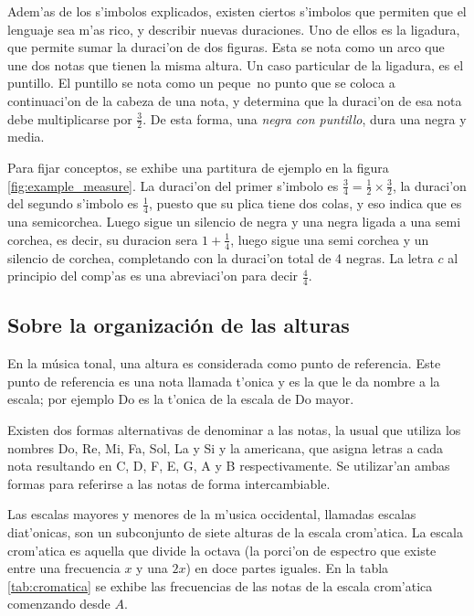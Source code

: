 Adem'as de los s'imbolos explicados, existen ciertos s'imbolos que permiten que el lenguaje sea m'as rico, y describir nuevas duraciones. Uno de ellos
es la ligadura, que permite sumar la duraci'on de dos figuras. Esta se nota como un arco que une dos notas que tienen la misma altura. 
Un caso particular de la ligadura, es el puntillo. El puntillo se nota como un peque~no punto que se coloca a 
continuaci'on de la cabeza de una nota, y determina que la duraci'on de esa nota debe multiplicarse por $\frac{3}{2}$. 
De esta forma, una \emph{negra con puntillo}, dura una negra y media. 

Para fijar conceptos, se exhibe una partitura de ejemplo en la figura \ref{fig:example_measure}. 
La duraci'on del primer s'imbolo es $\frac{3}{4}=\frac{1}{2}\times\frac{3}{2}$,
la duraci'on del segundo s'imbolo es $\frac{1}{4}$, puesto que su plica tiene dos colas, y eso indica que es una semicorchea. Luego sigue un silencio de negra
y una negra ligada a una semi corchea, es decir, su duracion sera $1 + \frac{1}{4}$, luego sigue una semi corchea y un silencio de corchea, completando
con la duraci'on total de 4 negras. La letra $c$ al principio del comp'as es una abreviaci'on para decir $\frac{4}{4}$.

\begin{imagen}
    \width{12.5cm}
\end{imagen}

\subsection{Sobre la organizaci\'on de las alturas}
En la música tonal, una altura es considerada como punto de referencia.  Este punto de referencia es una nota llamada t'onica y es
la que le da nombre a la escala; por ejemplo Do es la t'onica de la escala de Do mayor. 

Existen dos formas alternativas de denominar a las notas, la usual que utiliza los nombres Do, Re, Mi, Fa, Sol, La y Si y la americana, que 
asigna letras a cada nota resultando en C, D, F, E, G, A y B respectivamente. Se utilizar'an ambas formas para referirse a las notas de forma
intercambiable. 

Las escalas mayores y menores de la m'usica occidental, llamadas escalas diat'onicas, 
son un subconjunto de siete alturas de la escala crom'atica.
La escala crom'atica es aquella que divide la octava (la porci'on de espectro que existe entre una frecuencia $x$ y una $2x$)
en doce partes iguales.
En la tabla \ref{tab:cromatica} se exhibe las frecuencias de las notas de la escala crom'atica 
comenzando desde $A$. 


